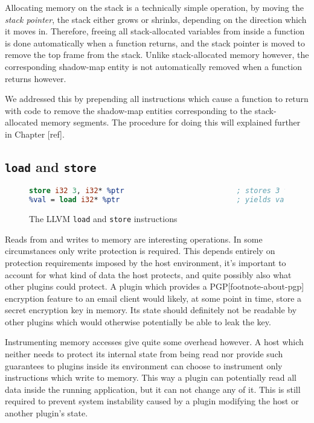 Allocating memory on the stack is a technically simple operation, by moving the
\emph{stack pointer}, the stack either grows or shrinks, depending on the
direction which it moves in. Therefore, freeing all stack-allocated variables
from inside a function is done automatically when a function returns, and the
stack pointer is moved to remove the top frame from the stack. Unlike
stack-allocated memory however, the corresponding shadow-map entity is not
automatically removed when a function returns however.

We addressed this by prepending all instructions which cause a function to
return with code to remove the shadow-map entities corresponding to the
stack-allocated memory segments. The procedure for doing this will explained
further in Chapter [ref].

\subsection {\texttt{load} and \texttt{store}}

\begin{figure}[ht]
\begin{lstlisting}[language=llvm]
store i32 3, i32* %ptr                          ; stores 3 to *ptr
%val = load i32* %ptr                           ; yields val = *ptr
\end{lstlisting}
\caption{The LLVM \texttt{load} and \texttt{store} instructions}
\end{figure}

\noindent Reads from and writes to memory are interesting operations. In some
circumstances only write protection is required. This depends entirely on
protection requirements imposed by the host environment, it's important to
account for what kind of data the host protects, and quite possibly also what
other plugins could protect. A plugin which provides a PGP[footnote-about-pgp]
encryption feature to an email client would likely, at some point in time, store
a secret encryption key in memory. Its state should definitely not be readable
by other plugins which would otherwise potentially be able to leak the key.

Instrumenting memory accesses give quite some overhead however. A host which
neither needs to protect its internal state from being read nor provide such
guarantees to plugins inside its environment can choose to instrument only
instructions which write to memory. This way a plugin can potentially read all
data inside the running application, but it can not change any of it. This is
still required to prevent system instability caused by a plugin modifying the
host or another plugin's state.

